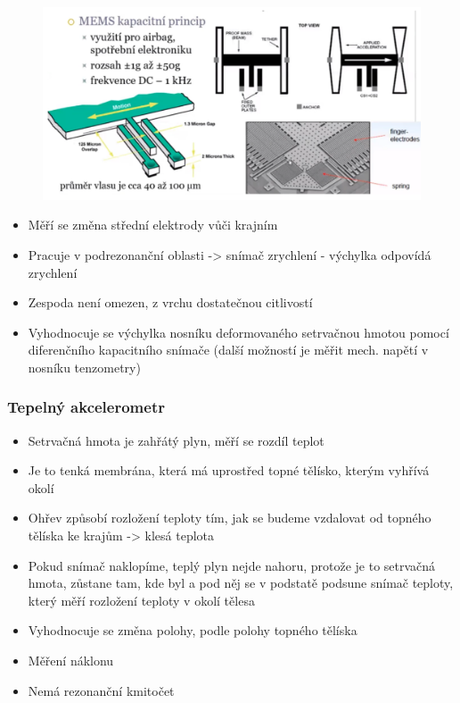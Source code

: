 \begin{figure}[h]
    \centering
    \includegraphics[scale = 0.50]{img/MEMSVIB.png}
\end{figure}

\begin{itemize}
    \item Měří se změna střední elektrody vůči krajním
    \item Pracuje v podrezonanční oblasti -> snímač zrychlení - výchylka odpovídá zrychlení
    \item Zespoda není omezen, z vrchu dostatečnou citlivostí
    \item Vyhodnocuje se výchylka nosníku deformovaného setrvačnou hmotou pomocí diferenčního kapacitního snímače (další možností je měřit mech. napětí v nosníku tenzometry)
\end{itemize}

\subsubsection*{Tepelný akcelerometr}
\begin{itemize}
    \item Setrvačná hmota je zahřátý plyn, měří se rozdíl teplot
    \item Je to tenká membrána, která má uprostřed topné tělísko, kterým vyhřívá okolí
    \item Ohřev způsobí rozložení teploty tím, jak se budeme vzdalovat od topného tělíska ke krajům -> klesá teplota
    \item Pokud snímač naklopíme, teplý plyn nejde nahoru, protože je to setrvačná hmota, zůstane tam, kde byl a pod něj se v podstatě podsune snímač teploty, který měří rozložení teploty v okolí tělesa
    \item Vyhodnocuje se změna polohy, podle polohy topného tělíska
    \item Měření náklonu
    \item Nemá rezonanční kmitočet
\end{itemize}

